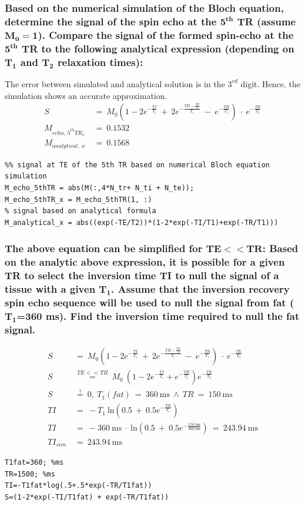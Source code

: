 \subsubsection{Based on the numerical simulation of the Bloch equation, determine the signal of the
spin echo at the $\mathbf{5^{th}}$ TR (assume $\mathbf{M_0=1}$). Compare the signal of the formed spin-echo at the
$\mathbf{5^{th}}$ TR to the following analytical expression (depending on $\mathbf{T_1}$ and $\mathbf{T_2}$ relaxation times):}
The error between simulated and analytical solution is in the $3^{rd}$ digit. Hence, the simulation shows an accurate approximation.
\begin{align}
S\ &=\ M_0\left( 1-2e^{-\frac{TI}{T_1}}\ +\ 2e^{-\frac{TR-\frac{TE}{2}}{T_1}}\ -\ e^{-\frac{TR}{T_1}}\right)\ \cdot\ e^{-\frac{TE}{T_2}}\\
M_{echo,\ 5^{th}TR_x}\ &=\ 0.1532\\
M_{analytical,\ x}\ &=\ 0.1568
\end{align}

\begin{lstlisting}
%% signal at TE of the 5th TR based on numerical Bloch equation simulation
M_echo_5thTR = abs(M(:,4*N_tr+ N_ti + N_te));
M_echo_5thTR_x = M_echo_5thTR(1, :)
% signal based on analytical formula
M_analytical_x = abs((exp(-TE/T2))*(1-2*exp(-TI/T1)+exp(-TR/T1)))
\end{lstlisting}

\subsubsection{The above equation can be simplified for $\mathbf{TE<<TR}$:
Based on the analytic above expression, it is possible for a given TR to select the inversion time TI to null the signal of a tissue with a given $\mathbf{T_1}$. Assume that the inversion recovery spin echo sequence will be used to null the signal from fat ($\mathbf{T_1}$=360 ms). Find the inversion time required to null the fat signal.}
\begin{align}
S\ &=\ M_0\left( 1-2e^{-\frac{TI}{T_1}}\ +\ 2e^{-\frac{TR-\frac{TE}{2}}{T_1}}\ -\ e^{-\frac{TR}{T_1}}\right)\ \cdot\ e^{-\frac{TE}{T_2}}\\
S\ &\overset{TE<<TR}=\ M_0\ \left(1-2e^{-\frac{TI}{T_1}} + e^{-\frac{TR}{T_1}} \right) e^{-\frac{TE}{T_2}}\\
S\ &\overset{!}=\ 0,\  T_1(fat)\ =\ \SI{360}{\ms}\ \wedge\  TR\ =\ \SI{150}{\ms}\\
TI\ &=\ -T_1\ \mathrm{ln}\left(0.5\ +\ 0.5e^{-\frac{TR}{T_1}}\right)\\
TI\ &=\ -\SI{360}{\ms}\ \cdot\ \mathrm{ln}\left(0.5\ +\ 0.5e^{-\frac{\SI{150}{\ms}}{\SI{360}{\ms}}}\right)\ =\ \SI{243.94}{\ms}\\
TI_{sim}\ &=\ \SI{243.94}{\ms}
\end{align}

\begin{lstlisting}
T1fat=360; %ms
TR=1500; %ms
TI=-T1fat*log(.5+.5*exp(-TR/T1fat))
S=(1-2*exp(-TI/T1fat) + exp(-TR/T1fat))
\end{lstlisting}